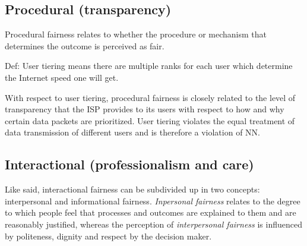 \subsection*{Procedural (transparency)}
Procedural fairness relates to whether the procedure or mechanism that determines the outcome is perceived as fair.

Def: User tiering means there are multiple ranks for each user which determine the Internet speed one will get.

With respect to user tiering, procedural fairness is closely related to the level of transparency that the ISP provides to its users with respect to how and why certain data packets are prioritized. User tiering violates the equal treatment of data transmission of different users and is therefore a violation of NN.

\subsection*{Interactional (professionalism and care)}
Like said, interactional fairness can be subdivided up in two concepts: interpersonal and informational fairness. \emph{Inpersonal fairness} relates to the degree to which people feel that processes and outcomes are explained to them and are reasonably justified, whereas the perception of \emph{interpersonal fairness} is influenced by politeness, dignity and respect by the decision maker.